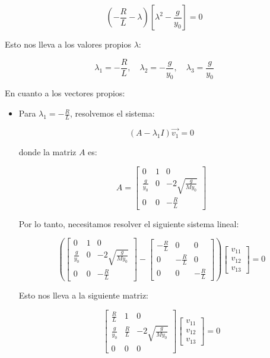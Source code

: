 \begin{enumerate}
\[
 \left( -\frac{R}{L} - \lambda \right) \left[ \lambda^2 - \frac{g}{y_0} \right] = 0
\]

Esto nos lleva a los valores propios \( \lambda \):

\[
\lambda_1 = -\frac{R}{L}, \quad \lambda_{2} = -\frac{g}{y_0}, \quad \lambda_{3} =\frac{g}{y_0}
\]

En cuanto a los vectores propios:
\begin{itemize}
    \item Para \( \lambda_1 = -\frac{R}{L} \), resolvemos el sistema:

\[
(A - \lambda_1 I) \Vec{v_1} = 0
\]

donde la matriz \( A \) es:

\[
A = 
\begin{bmatrix}
0 & 1 & 0 \\
\frac{g}{y_0} & 0 & -2\sqrt{\frac{g}{M y_0}} \\
0 & 0 & -\frac{R}{L}
\end{bmatrix}
\]

Por lo tanto, necesitamos resolver el siguiente sistema lineal:

\[
\left( 
\begin{bmatrix}
0 & 1 & 0 \\
\frac{g}{y_0} & 0 & -2\sqrt{\frac{g}{M y_0}} \\
0 & 0 & -\frac{R}{L}
\end{bmatrix}
- 
\begin{bmatrix}
-\frac{R}{L} & 0 & 0 \\
0 & -\frac{R}{L} & 0 \\
0 & 0 & -\frac{R}{L}
\end{bmatrix}
\right)
\begin{bmatrix}
v_{11} \\
v_{12} \\
v_{13}
\end{bmatrix}
= 0
\]

Esto nos lleva a la siguiente matriz:

\[
\begin{bmatrix}
\frac{R}{L} & 1 & 0 \\
\frac{g}{y_0} & \frac{R}{L} & -2\sqrt{\frac{g}{M y_0}} \\
0 & 0 & 0
\end{bmatrix}
\begin{bmatrix}
v_{11} \\
v_{12} \\
v_{13}
\end{bmatrix}
= 0
\]


\end{itemize}
\end{enumerate}
